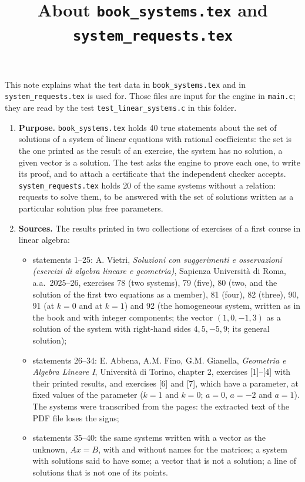 \documentclass[11pt,a4paper]{article}
\title{About \texttt{book\_systems.tex} and \texttt{system\_requests.tex}}
\author{}
\date{}
\begin{document}
\maketitle
This note explains what the test data in \texttt{book\_systems.tex} and in \texttt{system\_requests.tex} is used for. Those files are input for the engine in \texttt{main.c}; they are read by the test \texttt{test\_linear\_systems.c} in this folder.

\begin{enumerate}
\item \textbf{Purpose.} \texttt{book\_systems.tex} holds 40 true statements about the set of solutions of a system of linear equations with rational coefficients: the set is the one printed as the result of an exercise, the system has no solution, a given vector is a solution. The test asks the engine to prove each one, to write its proof, and to attach a certificate that the independent checker accepts. \texttt{system\_requests.tex} holds 20 of the same systems without a relation: requests to solve them, to be answered with the set of solutions written as a particular solution plus free parameters.

\item \textbf{Sources.} The results printed in two collections of exercises of a first course in linear algebra:
\begin{itemize}
\item statements 1--25: A. Vietri, \emph{Soluzioni con suggerimenti e osservazioni (esercizi di algebra lineare e geometria)}, Sapienza Universit\`a di Roma, a.a.\ 2025--26, exercises 78 (two systems), 79 (five), 80 (two, and the solution of the first two equations as a member), 81 (four), 82 (three), 90, 91 (at $k = 0$ and at $k = 1$) and 92 (the homogeneous system, written as in the book and with integer components; the vector $(1, 0, -1, 3)$ as a solution of the system with right-hand sides $4, 5, -5, 9$; its general solution);
\item statements 26--34: E. Abbena, A.M. Fino, G.M. Gianella, \emph{Geometria e Algebra Lineare I}, Universit\`a di Torino, chapter 2, exercises [1]--[4] with their printed results, and exercises [6] and [7], which have a parameter, at fixed values of the parameter ($k = 1$ and $k = 0$; $a = 0$, $a = -2$ and $a = 1$). The systems were transcribed from the pages: the extracted text of the PDF file loses the signs;
\item statements 35--40: the same systems written with a vector as the unknown, $A x = B$, with and without names for the matrices; a system with solutions said to have some; a vector that is not a solution; a line of solutions that is not one of its points.
\end{itemize}


\end{enumerate}
\end{document}
